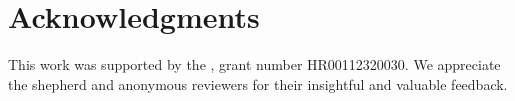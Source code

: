 \section*{Acknowledgments}
\label{sec:ack}

This work was supported by the \DARPA, grant number HR00112320030.
We appreciate the shepherd and anonymous reviewers for their insightful and valuable feedback.